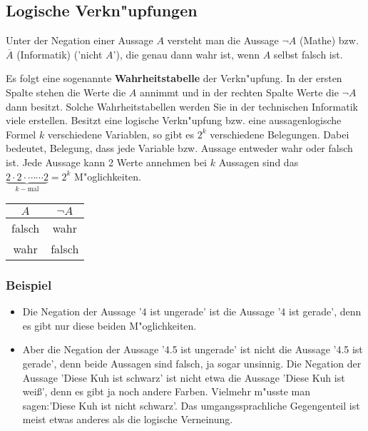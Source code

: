 \subsection{Logische Verkn"upfungen}
\begin{definition}[Negation]
Unter der Negation einer Aussage $A$ versteht man die Aussage $\neg A$ (Mathe) bzw. $\overline{A}$ (Informatik) ('nicht $A$'), die genau dann wahr ist, wenn $A$ selbst falsch ist.
\end{definition}
Es folgt eine sogenannte \textbf{Wahrheitstabelle} der Verkn"upfung. In der ersten Spalte stehen die Werte die $A$ annimmt und in der rechten Spalte Werte die $\neg A$ dann besitzt. Solche Wahrheitstabellen werden Sie in der technischen Informatik viele erstellen. Besitzt eine logische Verkn"upfung bzw. eine aussagenlogische Formel $k$ verschiedene Variablen, so gibt es $2^k$ verschiedene Belegungen. Dabei bedeutet, Belegung, dass jede Variable bzw. Aussage entweder wahr oder falsch ist. Jede Aussage kann 2 Werte annehmen bei $k$ Aussagen sind das $\underbrace{2 \cdot 2 \cdot \cdots \cdots 2}_{k-\text{mal}} = 2^k$ M"oglichkeiten.
\begin{center}
\begin{tabular}{c||c}
 $A$ & $\neg A$  \\ 
\hline
\cellcolor{ared}falsch  & \cellcolor{agreen}wahr   \\ 
\cellcolor{green}wahr  & \cellcolor{ared} falsch  \\ 
\hline
\end{tabular}
\end{center}

\subsubsection*{Beispiel}
\begin{itemize}
	\item Die Negation der Aussage '4 ist ungerade' ist die Aussage '4 ist gerade', denn es gibt nur diese beiden M"oglichkeiten.
	\item Aber die Negation der Aussage '4.5 ist ungerade' ist nicht die Aussage '4.5 ist gerade', denn beide Aussagen sind falsch, ja sogar unsinnig. Die Negation der Aussage 'Diese Kuh ist schwarz' ist nicht etwa die Aussage 'Diese Kuh ist wei{\ss}', denn es gibt ja noch andere Farben. Vielmehr m"usste man sagen:'Diese Kuh ist nicht schwarz'. Das umgangssprachliche Gegengenteil ist meist etwas anderes als die logische Verneinung.
\end{itemize}

